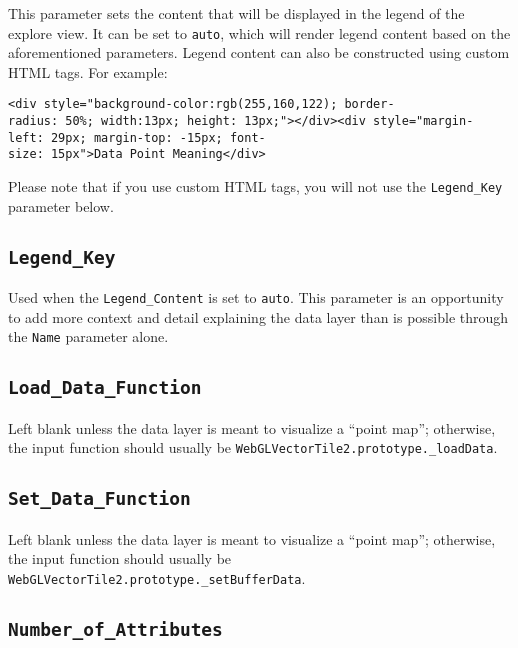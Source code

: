 \documentclass[
]{krantz}
\begin{document}
This parameter sets the content that will be displayed in the legend of the explore view. It can be set to \texttt{auto}, which will render legend content based on the aforementioned parameters. Legend content can also be constructed using custom HTML tags. For example:

\texttt{\textless{}div\ style="background-color:rgb(255,160,122);\ border-radius:\ 50\%;\ width:13px;\ height:\ 13px;"\textgreater{}\textless{}/div\textgreater{}\textless{}div\ style="margin-left:\ 29px;\ margin-top:\ -15px;\ font-size:\ 15px"\textgreater{}Data\ Point\ Meaning\textless{}/div\textgreater{}}

Please note that if you use custom HTML tags, you will not use the \texttt{Legend\_Key} parameter below.

\hypertarget{legend_key}{%
\subsection*{\texorpdfstring{\texttt{Legend\_Key}}{Legend\_Key}}\label{legend_key}}


Used when the \texttt{Legend\_Content} is set to \texttt{auto}. This parameter is an opportunity to add more context and detail explaining the data layer than is possible through the \texttt{Name} parameter alone.

\hypertarget{load_data_function}{%
\subsection*{\texorpdfstring{\texttt{Load\_Data\_Function}}{Load\_Data\_Function}}\label{load_data_function}}


Left blank unless the data layer is meant to visualize a ``point map''; otherwise, the input function should usually be \texttt{WebGLVectorTile2.prototype.\_loadData}.

\hypertarget{set_data_function}{%
\subsection*{\texorpdfstring{\texttt{Set\_Data\_Function}}{Set\_Data\_Function}}\label{set_data_function}}


Left blank unless the data layer is meant to visualize a ``point map''; otherwise, the input function should usually be \texttt{WebGLVectorTile2.prototype.\_setBufferData}.

\hypertarget{number_of_attributes}{%
\subsection*{\texorpdfstring{\texttt{Number\_of\_Attributes}}{Number\_of\_Attributes}}\label{number_of_attributes}}
\end{document}
